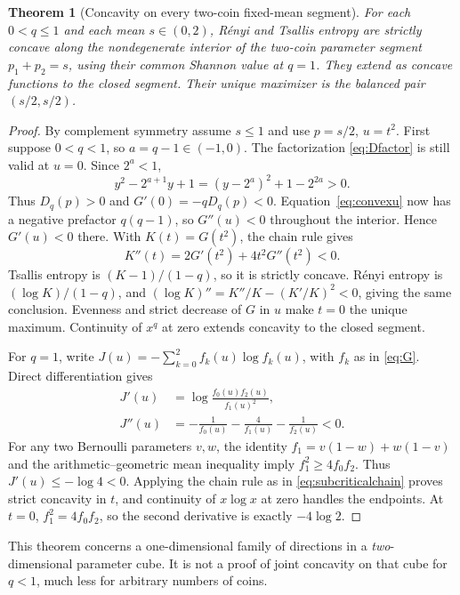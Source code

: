\documentclass[11pt]{article}
\numberwithin{equation}{section}
\newtheorem{theorem}{Theorem}[section]
\theoremstyle{definition}
\theoremstyle{remark}
\begin{document}
\begin{theorem}[Concavity on every two-coin fixed-mean segment]
\label{thm:subcritical}
For each $0<q\leq1$ and each mean $s\in(0,2)$, R\'enyi and Tsallis entropy
are strictly concave along the nondegenerate interior of the two-coin
parameter segment $p_1+p_2=s$, using their common Shannon value at $q=1$.
They extend as concave functions to the closed segment. Their unique
maximizer is the balanced pair $(s/2,s/2)$.
\end{theorem}
\begin{proof}
By complement symmetry assume $s\leq1$ and use $p=s/2$, $u=t^2$.
First suppose $0<q<1$, so $a=q-1\in(-1,0)$. The factorization
\eqref{eq:Dfactor} is still valid at $u=0$. Since $2^a<1$,
\[
 y^2-2^{a+1}y+1=(y-2^a)^2+1-2^{2a}>0.
\]
Thus $D_q(p)>0$ and $G'(0)=-qD_q(p)<0$.
Equation~\eqref{eq:convexu} now has a negative prefactor $q(q-1)$, so
$G''(u)<0$ throughout the interior. Hence $G'(u)<0$ there. With
$K(t)=G(t^2)$, the chain rule gives
\begin{equation}
 K''(t)=2G'(t^2)+4t^2G''(t^2)<0.\label{eq:subcriticalchain}
\end{equation}
Tsallis entropy is $(K-1)/(1-q)$, so it is strictly concave. R\'enyi entropy
is $(\log K)/(1-q)$, and
$(\log K)''=K''/K-(K'/K)^2<0$, giving the same conclusion.
Evenness and strict decrease of $G$ in $u$ make $t=0$ the unique maximum.
Continuity of $x^q$ at zero extends concavity to the closed segment.

For $q=1$, write $J(u)=-\sum_{k=0}^2 f_k(u)\log f_k(u)$, with $f_k$ as in
\eqref{eq:G}. Direct differentiation gives
\begin{align}
 J'(u)&=\log\frac{f_0(u)f_2(u)}{f_1(u)^2},\label{eq:shannonderivative}\\
 J''(u)&=-\frac1{f_0(u)}-\frac4{f_1(u)}-\frac1{f_2(u)}<0.
\end{align}
For any two Bernoulli parameters $v,w$, the identity
$f_1=v(1-w)+w(1-v)$ and the arithmetic--geometric mean inequality imply
$f_1^2\geq4f_0f_2$. Thus $J'(u)\leq-\log4<0$.
Applying the chain rule as in \eqref{eq:subcriticalchain} proves strict
concavity in $t$, and continuity of $x\log x$ at zero handles the endpoints.
At $t=0$, $f_1^2=4f_0f_2$, so the second derivative is exactly $-4\log2$.
\end{proof}

This theorem concerns a one-dimensional family of directions in a
\emph{two}-dimensional parameter cube. It is not a proof of joint concavity
on that cube for $q<1$, much less for arbitrary numbers of coins.
\end{document}
